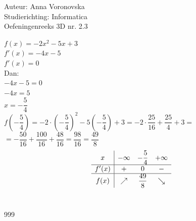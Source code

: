 \documentclass[a4paper]{article}
\begin{document}
\noindent \large Auteur: Anna Voronovska \\
\noindent \large Studierichting: Informatica \\
\noindent \large Oefeningenreeks 3D nr. 2.3 \\

\bigskip 

\normalsize



$f(x) = -2x^2 - 5x + 3$\\

$f'(x) = -4x - 5$\\

$f'(x) = 0$\\

Dan: \\

$-4x - 5 = 0$ \\

$-4x = 5 $\\

$x = -\dfrac{5}{4}$\\

$f\left(-\dfrac{5}{4}\right) = -2\cdot \left(-\dfrac{5}{4}\right)^2 - 5\left(-\dfrac{5}{4}\right) + 3 = -2 \cdot \dfrac{25}{16} + \dfrac{25}{4} + 3 =$\\

$= -\dfrac{50}{16} + \dfrac{100}{16} + \dfrac{48}{16} = \dfrac{98}{16} = \dfrac{49}{8}$\\


\[
\begin{array}{c|c c c}
    x & -\infty &-\dfrac{5}{4} &  +\infty \\
    \hline
    f'(x) & + & 0 & - \\
    \hline
    f(x) & \nearrow & \dfrac{49}{8} & \searrow \\
\end{array}
\]\\

\begin{thebibliography}{999}
\end{thebibliography}
\end{document}
